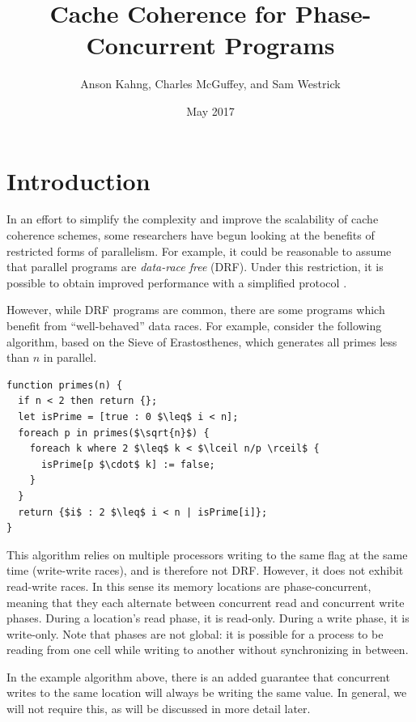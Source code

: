 \documentclass{article}
\title{Cache Coherence for Phase-Concurrent Programs}
\author{Anson Kahng, Charles McGuffey, and Sam Westrick}
\date{May 2017}
\begin{document}
\newcommand{\todo}[1]{{\color{red} \textbf{TODO}: {#1}}}

\maketitle

\section{Introduction}\label{sec:intro}

In an effort to simplify the complexity and improve the scalability of cache coherence schemes, some researchers have begun looking at the benefits of restricted forms of parallelism. For example, it could be reasonable to assume that parallel programs are \textit{data-race free} (DRF). Under this restriction, it is possible to obtain improved performance with a simplified protocol \cite{choi2010denovo, ros2012complexity}.

However, while DRF programs are common, there are some programs which benefit from ``well-behaved'' data races. For example, consider the following algorithm, based on the Sieve of Erastosthenes, which generates all primes less than $n$ in parallel.

\begin{lstlisting}
function primes(n) {
  if n < 2 then return {};
  let isPrime = [true : 0 $\leq$ i < n];
  foreach p in primes($\sqrt{n}$) {
    foreach k where 2 $\leq$ k < $\lceil n/p \rceil$ {
      isPrime[p $\cdot$ k] := false;
    }
  }
  return {$i$ : 2 $\leq$ i < n | isPrime[i]};
}
\end{lstlisting}

This algorithm relies on multiple processors writing to the same flag at the same time (write-write races), and is therefore not DRF. However, it does not exhibit read-write races. In this sense its memory locations are phase-concurrent, meaning that they each alternate between concurrent read and concurrent write phases. During a location's read phase, it is read-only. During a write phase, it is write-only. Note that phases are not global: it is possible for a process to be reading from one cell while writing to another without synchronizing in between.

In the example algorithm above, there is an added guarantee that concurrent writes to the same location will always be writing the same value. In general, we will not require this, as will be discussed in more detail later.
\end{document}
